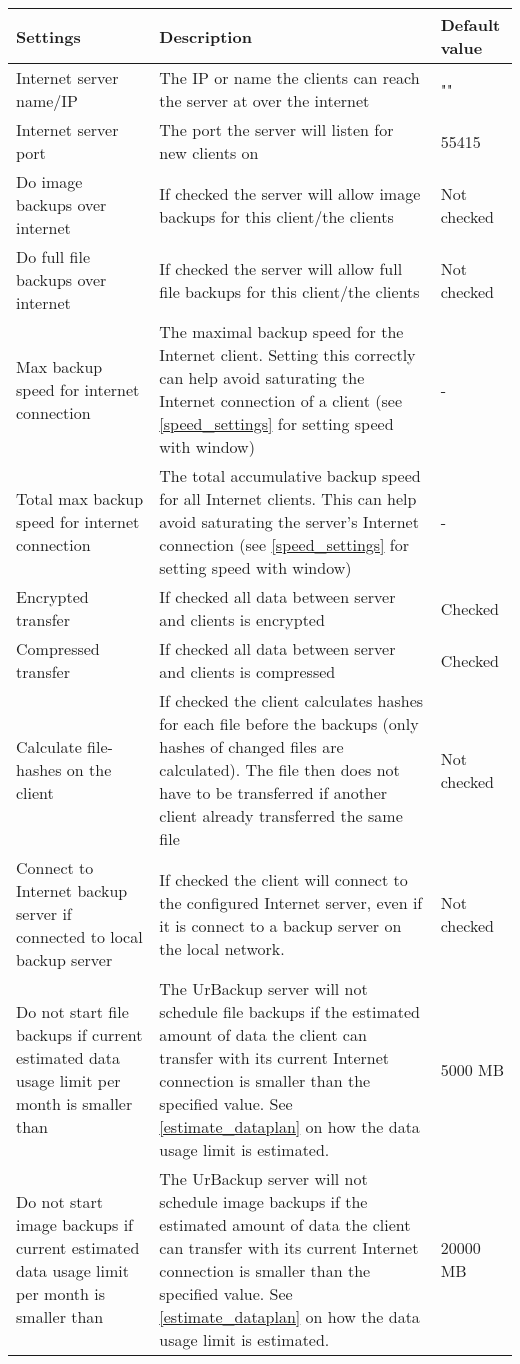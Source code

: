 \documentclass[a4paper,10pt]{article}
\begin{document}
\begin{tabular}{|p{}|p{}|p{}|}
\hline
Settings  & Description & Default value\\
\hline\hline
Internet server name/IP & The IP or name the clients can reach the server at over the internet & ""\\
\hline
Internet server port & The port the server will listen for new clients on & 55415 \\
\hline
Do image backups over internet & If checked the server will allow image backups for this client/the clients & Not checked \\
\hline
Do full file backups over internet & If checked the server will allow full file backups for this client/the clients & Not checked \\
\hline
Max backup speed for internet connection & The maximal backup speed for the Internet client. Setting this correctly can help avoid saturating the Internet connection of a client (see \ref{speed_settings} for setting speed with window) & - \\
\hline
Total max backup speed for internet connection & The total accumulative backup speed for all Internet clients. This can help avoid saturating the server's Internet connection (see \ref{speed_settings} for setting speed with window) & - \\
\hline
Encrypted transfer & If checked all data between server and clients is encrypted & Checked \\
\hline
Compressed transfer & If checked all data between server and clients is compressed & Checked \\
\hline
Calculate file-hashes on the client & If checked the client calculates hashes for each file before the backups (only hashes of changed files are calculated).
The file then does not have to be transferred if another client already transferred the same file & Not checked \\
\hline
Connect to Internet backup server if connected to local backup server & If checked the client will connect to the configured Internet server, even if it is connect to a backup server on the local network. & Not checked \\
\hline
Do not start file backups if current estimated data usage limit per month is smaller than & The UrBackup server will not schedule file backups if the estimated amount of data the client can transfer with its current Internet connection is smaller than the specified value. See \ref{estimate_dataplan} on how the data usage limit is estimated. & 5000 MB \\
\hline
Do not start image backups if current estimated data usage limit per month is smaller than & The UrBackup server will not schedule image backups if the estimated amount of data the client can transfer with its current Internet connection is smaller than the specified value. See \ref{estimate_dataplan} on how the data usage limit is estimated. & 20000 MB \\
\hline
\end{tabular}
\end{document}
